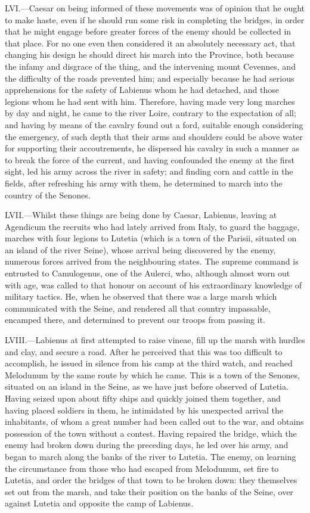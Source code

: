 LVI.—Caesar on being informed of these movements was of opinion that he
ought to make haste, even if he should run some risk in completing the
bridges, in order that he might engage before greater forces of the
enemy should be collected in that place. For no one even then considered
it an absolutely necessary act, that changing his design he should
direct his march into the Province, both because the infamy and disgrace
of the thing, and the intervening mount Cevennes, and the difficulty of
the roads prevented him; and especially because he had serious
apprehensions for the safety of Labienus whom he had detached, and those
legions whom he had sent with him. Therefore, having made very long
marches by day and night, he came to the river Loire, contrary to the
expectation of all; and having by means of the cavalry found out a ford,
suitable enough considering the emergency, of such depth that their arms
and shoulders could be above water for supporting their accoutrements,
he dispersed his cavalry in such a manner as to break the force of the
current, and having confounded the enemy at the first sight, led his
army across the river in safety; and finding corn and cattle in the
fields, after refreshing his army with them, he determined to march into
the country of the Senones.

LVII.—Whilst these things are being done by Caesar, Labienus, leaving
at Agendicum the recruits who had lately arrived from Italy, to guard
the baggage, marches with four legions to Lutetia (which is a town of
the Parisii, situated on an island of the river Seine), whose arrival
being discovered by the enemy, numerous forces arrived from the
neighbouring states. The supreme command is entrusted to Camulogenus,
one of the Aulerci, who, although almost worn out with age, was called
to that honour on account of his extraordinary knowledge of military
tactics. He, when he observed that there was a large marsh which
communicated with the Seine, and rendered all that country impassable,
encamped there, and determined to prevent our troops from passing it.

LVIII.—Labienus at first attempted to raise vineae, fill up the marsh
with hurdles and clay, and secure a road. After he perceived that this
was too difficult to accomplish, he issued in silence from his camp at
the third watch, and reached Melodunum by the same route by which he
came. This is a town of the Senones, situated on an island in the Seine,
as we have just before observed of Lutetia. Having seized upon about
fifty ships and quickly joined them together, and having placed soldiers
in them, he intimidated by his unexpected arrival the inhabitants, of
whom a great number had been called out to the war, and obtains
possession of the town without a contest. Having repaired the bridge,
which the enemy had broken down during the preceding days, he led over
his army, and began to march along the banks of the river to Lutetia.
The enemy, on learning the circumstance from those who had escaped from
Melodunum, set fire to Lutetia, and order the bridges of that town to be
broken down: they themselves set out from the marsh, and take their
position on the banks of the Seine, over against Lutetia and opposite
the camp of Labienus.

